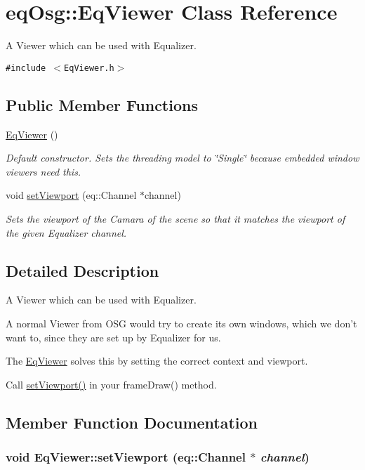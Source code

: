\hypertarget{a00009}{
\section{eqOsg::EqViewer Class Reference}
\label{a00009}
}
A Viewer which can be used with Equalizer.  


{\tt \#include $<$EqViewer.h$>$}

\subsection*{Public Member Functions}
\begin{CompactItemize}
\item 
\hypertarget{a00009_bd6695b9ab0b08062c3d6377ae8ac275}{
\hyperlink{a00009_bd6695b9ab0b08062c3d6377ae8ac275}{EqViewer} ()}
\label{a00009_bd6695b9ab0b08062c3d6377ae8ac275}

\begin{CompactList}\small\item\em Default constructor. Sets the threading model to \char`\"{}Single\char`\"{} because embedded window viewers need this. \item\end{CompactList}\item 
void \hyperlink{a00009_c998d9f70b12556a17396dfdabb2c185}{setViewport} (eq::Channel $\ast$channel)
\begin{CompactList}\small\item\em Sets the viewport of the Camara of the scene so that it matches the viewport of the given Equalizer channel. \item\end{CompactList}\end{CompactItemize}


\subsection{Detailed Description}
A Viewer which can be used with Equalizer. 

A normal Viewer from OSG would try to create its own windows, which we don't want to, since they are set up by Equalizer for us.

The \hyperlink{a00009}{EqViewer} solves this by setting the correct context and viewport.

Call \hyperlink{a00009_c998d9f70b12556a17396dfdabb2c185}{setViewport()} in your frameDraw() method. 

\subsection{Member Function Documentation}
\hypertarget{a00009_c998d9f70b12556a17396dfdabb2c185}{
\subsubsection[{setViewport}]{\setlength{\rightskip}{0pt plus 5cm}void EqViewer::setViewport (eq::Channel $\ast$ {\em channel})}}
\label{a00009_c998d9f70b12556a17396dfdabb2c185}



